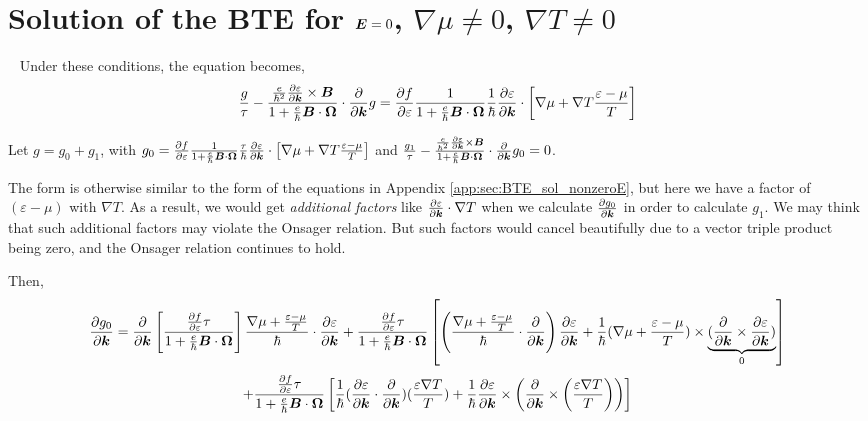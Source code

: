 \documentclass{report}
\renewcommand\vec[1]{\ensuremath\boldsymbol{#1}} %
\begin{document}
\section{Solution of the BTE for $\vec{E} =  0$, $\nabla \mu \neq 0$, $\nabla T \neq 0$}~\label{app:sec:BTE_sol_nonzeroGradMuGradT}
Under these conditions, the equation becomes,
$$
\frac{g}{\tau} -\frac{\frac{e}{\hbar^2} \frac{\partial \varepsilon}{\partial \vec{k}} \times \vec{B}}{1 + \frac{e}{\hbar} \vec{B}\cdot\vec{\Omega}} \cdot\frac{\partial}{\partial \vec{k}} g = \frac{\partial f}{\partial \varepsilon}\frac{1}{1 + \frac{e}{\hbar} \vec{B}\cdot\vec{\Omega}}
\frac{1}{\hbar} \frac{\partial \varepsilon}{\partial \vec{k}}\cdot\left[ \nabla{\mu} + \nabla T \frac{\varepsilon - \mu}{T}\right] $$

Let $g = g_0 + g_1$, with $g_0 = \frac{\partial f}{\partial \varepsilon}\frac{1}{1 + \frac{e}{\hbar} \vec{B}\cdot\vec{\Omega}}
\frac{\tau}{\hbar} \frac{\partial \varepsilon}{\partial \vec{k}}\cdot\left[ \nabla{\mu} + \nabla T \frac{\varepsilon - \mu}{T}\right]$ and $\frac{g_1}{\tau} -\frac{\frac{e}{\hbar^2} \frac{\partial \varepsilon}{\partial \vec{k}} \times \vec{B}}{1 + \frac{e}{\hbar} \vec{B}\cdot\vec{\Omega}} \cdot\frac{\partial}{\partial \vec{k}} g_0 = 0$. 

The form is otherwise similar to the form of the equations in Appendix \ref{app:sec:BTE_sol_nonzeroE}, but here we have a factor of $(\varepsilon - \mu)$ with $\nabla T$. As a result, we would get \textit{additional factors} like $\frac{\partial \varepsilon}{\partial \vec{k}}\cdot \nabla T$ when we calculate $\frac{\partial g_0}{\partial \vec{k}}$ in order to calculate $g_1$. We may think that such additional factors may violate the Onsager relation. But such factors would cancel beautifully due to a vector triple product being zero, and the Onsager relation continues to hold.

Then,
$$\frac{\partial g_0}{\partial \vec{k}} = 
\frac{\partial}{\partial \vec{k}} \left[ \frac{\frac{\partial f} {\partial \varepsilon} \tau}{1 + \frac{e}{\hbar} \vec{B}\cdot\vec{\Omega}}
\right] \frac{\nabla \mu + \frac{\varepsilon - \mu}{T}}{\hbar} \cdot \frac{\partial \varepsilon}{\partial \vec{k}} + \frac{\frac{\partial f} {\partial \varepsilon} \tau}{1 + \frac{e}{\hbar} \vec{B}\cdot\vec{\Omega}} \left[\left(\frac{\nabla \mu + \frac{\varepsilon - \mu}{T}}{\hbar} \cdot \frac{\partial }{\partial \vec{k}} \right)\frac{\partial \varepsilon}{\partial \vec{k}} + \frac{1}{\hbar} (\nabla \mu + \frac{\varepsilon - \mu}{T})\times \underbrace{(\frac{\partial }{\partial \vec{k}} \times \frac{\partial \varepsilon}{\partial \vec{k}})}_0 \right]
$$
$$+ \frac{\frac{\partial f} {\partial \varepsilon} \tau}{1 + \frac{e}{\hbar} \vec{B}\cdot\vec{\Omega}} \left[\frac{1}{\hbar} (\frac{\partial \varepsilon}{\partial \vec{k}} \cdot \frac{\partial }{\partial \vec{k}}) (\frac{\varepsilon \nabla T}{T}) + \frac{1}{\hbar} \frac{\partial \varepsilon}{\partial \vec{k}} \times \left(  \frac{\partial }{\partial \vec{k}} \times \left(\frac{\varepsilon \nabla T}{T}\right) \right) \right]$$
\end{document}
